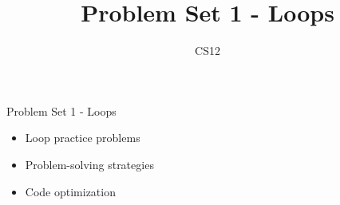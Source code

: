 \documentclass{beamer}
\title{Problem Set 1 - Loops}
\author{CS12}
\date{}
\begin{document}
\begin{frame}
    \titlepage
\end{frame}

\begin{frame}{Problem Set 1 - Loops}
    \begin{itemize}
        \item Loop practice problems
        \item Problem-solving strategies
        \item Code optimization
    \end{itemize}
\end{frame}
\end{document}
